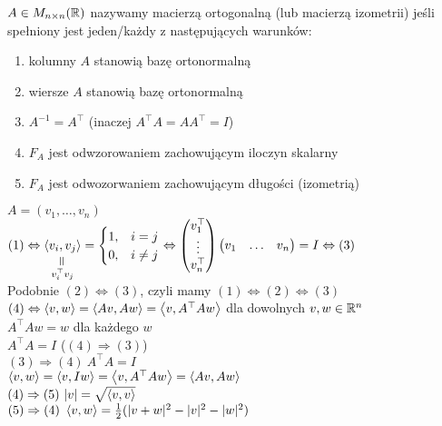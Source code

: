 \begin{df}[twierdznie]
  $A \in M_{n \times n}(\mathbb{R})$ nazywamy macierzą ortogonalną (lub macierzą
  izometrii) jeśli spełniony jest jeden/każdy z następujących warunków:
  \begin{enumerate}[(1)]
    \item kolumny $A$ stanowią bazę ortonormalną
    \item wiersze $A$ stanowią bazę ortonormalną
    \item $A^{-1} = A^\top$ (inaczej $A^\top A = AA^\top = I$)
    \item $F_A$ jest odwzorowaniem zachowującym iloczyn skalarny
    \item $F_A$ jest odwozorwaniem zachowującym długości (izometrią)
  \end{enumerate}
\end{df}
\begin{dd}
  $A = (v_1,\ldots,v_n)$ \\
  $(1) \Leftrightarrow \underscript{\scp{v_i}{v_j}}{\verteq}{v_i^\top v_j} =
  \begin{cases} 1, &i = j \\ 0, & i \neq j \end{cases} \Leftrightarrow
    \begin{pmatrix} v_1^\top \\ \vdots \\ v_n^\top \end{pmatrix}
    \begin{pmatrix} v_1 & \ldots & v_n \end{pmatrix} = I \Leftrightarrow (3)$ \\
  Podobnie $(2) \Leftrightarrow (3)$, czyli mamy $(1) \Leftrightarrow (2) \Leftrightarrow (3)$ \\
  $(4) \Leftrightarrow \left\langle v, w \right\rangle = \left\langle Av, Aw \right\rangle = \left\langle v, A^\top Aw \right\rangle$ dla dowolnych
  $v,w \in \mathbb{R}^n$ \\
  $A^\top A w = w$ dla każdego $w$ \\
  $A^\top A = I$ ($(4) \Rightarrow (3)$) \\
  $(3) \Rightarrow (4) \ A^\top A = I$ \\ 
  $\left\langle v, w \right\rangle = \left\langle v, Iw \right\rangle = \left\langle v, A^\top Aw \right\rangle = \left\langle Av, Aw \right\rangle$ \\ 
  $(4) \Rightarrow (5) \ |v| = \sqrt{\left\langle v, v \right\rangle}$ \\
  $(5) \Rightarrow (4) \ \left\langle v, w \right\rangle = \frac{1}{2} (|v + w|^2 - |v|^2 - |w|^2)$
\end{dd}

